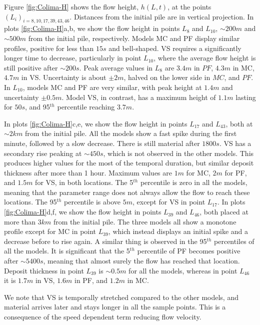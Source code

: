 \documentclass{article}
\begin{document}
Figure \ref{fig:Colima-H} shows the flow height, $h(L,t)$, at the points $(L_i)_{i=8,10,17,39,43,46}$. Distances from the initial pile are in vertical projection. In plots \ref{fig:Colima-H}a,b, we show the flow height in points $L_8$ and $L_{10}$, $\sim 200 m$ and $\sim 500 m$ from the initial pile, respectively. Models MC and PF display similar profiles, positive for less than $15 s$ and bell-shaped. VS requires a significantly longer time to decrease, particularly in point $L_{10}$, where the average flow height is still positive after $\sim 200 s$. Peak average values in $L_8$ are $3.4 m$ in $PF$, $4.3 m$ in MC, $4.7 m$ in VS. Uncertainty is about $\pm 2 m$, halved on the lower side in $MC$, and $PF$. In $L_{10}$, models MC and PF are very similar, with peak height at $1.4 m$ and uncertainty $\pm 0.5 m$. Model VS, in contrast, has a maximum height of $1.1 m$ lasting for $50s$, and 95$^{th}$ percentile reaching $3.7 m$.

In plots \ref{fig:Colima-H}c,e, we show the flow height in points $L_{17}$ and $L_{43}$, both at $\sim 2 km$ from the initial pile. All the models show a fast spike during the first minute, followed by a slow decrease. There is still material after $1800 s$. VS has a secondary rise peaking at $\sim 450 s$, which is not observed in the other models. This produces higher values for the most of the temporal duration, but similar deposit thickness after more than 1 hour. Maximum values are $1 m$ for MC, $2 m$ for PF, and $1.5 m$ for VS, in both locations. The 5$^{th}$ percentile is zero in all the models, meaning that the parameter range does not always allow the flow to reach these locations. The 95$^{th}$ percentile is above $5 m$, except for VS in point $L_{17}$. In plots \ref{fig:Colima-H}d,f, we show the flow height in points $L_{39}$ and $L_{46}$, both placed at more than $3 km$ from the initial pile. The three models all show a monotone profile except for  MC in point $L_{39}$, which instead displays an initial spike and a decrease before to rise again. A similar thing is observed in the 95$^{th}$ percentiles of all the models. It is significant that the 5$^{th}$ percentile of PF becomes positive after $\sim 5400 s$, meaning that almost surely the flow has reached that location. Deposit thickness in point $L_{39}$ is $\sim 0.5 m$ for all the models, whereas in point $L_{46}$ it is $1.7 m$ in VS, $1.6 m$ in PF, and $1.2 m$ in MC.

We note that VS is temporally stretched compared to the other models, and material arrives later and stays longer in all the sample points. This is a consequence of the speed dependent term reducing flow velocity.
\end{document}
